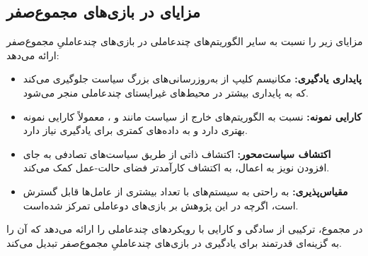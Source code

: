 \subsection{مزایای  در بازی‌های مجموع­‌صفر}

 مزایای زیر را نسبت به سایر الگوریتم‌های چند­عاملی در بازی‌های چندعاملیِ مجموع­‌صفر ارائه می‌دهد:

\begin{itemize}
    \item \textbf{پایداری یادگیری:} مکانیسم کلیپ  از به‌روزرسانی‌های بزرگ سیاست جلوگیری می‌کند که به پایداری بیشتر در محیط‌های غیرایستای چند­عاملی منجر می‌شود.
    \item \textbf{کارایی نمونه:} نسبت به الگوریتم‌های خارج از سیاست مانند  و ،  معمولاً کارایی نمونه بهتری دارد و به داده‌های کمتری برای یادگیری نیاز دارد.
    \item \textbf{اکتشاف سیاست‌محور:} اکتشاف ذاتی از طریق سیاست‌های تصادفی به جای افزودن نویز به اعمال، به اکتشاف کارآمدتر فضای حالت-عمل کمک می‌کند.
    \item \textbf{مقیاس‌پذیری:}  به راحتی به سیستم‌های با تعداد بیشتری از عامل‌ها قابل گسترش است، اگرچه در این پژوهش بر بازی‌های دو­عاملی تمرکز شده‌است.
\end{itemize}

در مجموع،  ترکیبی از سادگی و کارایی  با رویکردهای چند­عاملی را ارائه می‌دهد که آن را به گزینه‌ای قدرتمند برای یادگیری در بازی‌های چندعاملیِ مجموع­‌صفر تبدیل می‌کند.
